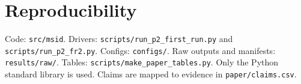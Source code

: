 \documentclass{article}
\theoremstyle{plain}
\theoremstyle{definition}
\theoremstyle{remark}
\begin{document}
\section{Reproducibility}
Code: \texttt{src/msid}. Drivers: \texttt{scripts/run\_p2\_first\_run.py} and
\texttt{scripts/run\_p2\_fr2.py}. Configs: \texttt{configs/}. Raw outputs and
manifests: \texttt{results/raw/}. Tables: \texttt{scripts/make\_paper\_tables.py}.
Only the Python standard library is used. Claims are mapped to evidence in
\texttt{paper/claims.csv}.
\end{document}
